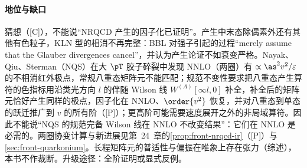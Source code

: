 \paragraph{地位与缺口}
猜想（[C]），不能说“NRQCD 产生的因子化已证明”。产生中末态除偶素外还有其他有色粒子，KLN 型的相消不再完整：BBL 对强子引起的过程“merely assume that the Glauber divergences cancel”，并认为产生论证不如衰变严格\cite[第~VI.A~节]{BodwinBraatenLepage1995}。Nayak、Qiu、Sterman（NQS）在大 $\pT$ 胶子碎裂中发现 NNLO（两圈）有 $\propto\as^2v^2/\varepsilon$ 的不相消红外极点，常规八重态矩阵元不能匹配；规范不变性要求把八重态产生算符的色指标用沿类光方向 $l$ 的伴随 Wilson 线 $W^{(A)}[\infty l,0]$ 补全，补全后的矩阵元恰好产生同样的极点，因子化在 NNLO、$\order{v^2}$ 恢复\cite{NayakQiuSterman2005a,NayakQiuSterman2005b}，并对八重态到单态的跃迁推广到 $v$ 的所有阶\cite{NayakQiuSterman2006}（[P]）；更高阶可能需要速度展开之外的非局域算符\cite{NayakQiuSterman2005a}。因此不能说“NQS 的规范完备 Wilson 线在 NNLO 不改变结果”：它们在 NNLO 是必需的。两圈协变计算与新进展见第~24~章的\cref{prop:front-nrqcd-ir}（[P]）与\cref{sec:front-quarkonium}。长程矩阵元的普适性与偏振在唯象上存在张力\cite{Butenschoen:2010rq,Butenschoen:2011yh,Butenschoen:2012px,Chao:2012iv}（综述\cite{BrambillaEtAl2011,Lansberg:2019adr}），本书不作裁断。升级途径：全阶证明或显式反例。

